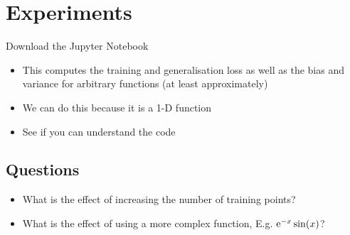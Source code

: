 \documentclass[11pt]{article}
\newcommand{\e}[1]{{\rm e}^{#1}}
\begin{document}
\section{Experiments}
\label{sec:org810bcb7}
Download the Jupyter Notebook

\begin{itemize}
\item This computes the training and generalisation loss as well as
the bias and variance for arbitrary functions (at least approximately)
\item We can do this because it is a 1-D function
\item See if you can understand the code
\end{itemize}

\subsection{Questions}
\label{sec:org9c42b9b}
\begin{itemize}
\item What is the effect of increasing the number of training points?
\item What is the effect of using a more complex function, E.g. \(\e{-x} \sin(x)\)?
\end{itemize}
\end{document}

